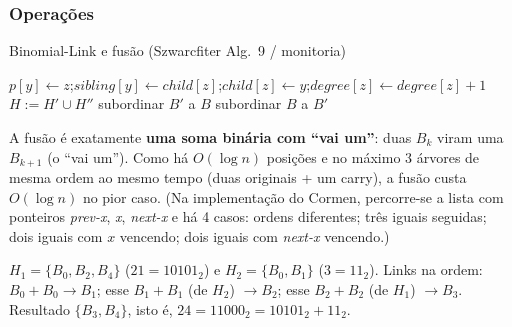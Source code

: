 \subsubsection{Operações}
\begin{pseudo}{Binomial-Link e fusão (Szwarcfiter Alg.\ 9 / monitoria)}
\begin{algorithmic}
 
  \State $p[y]\gets z$;\quad $sibling[y]\gets child[z]$;\quad $child[z]\gets y$;\quad $degree[z]\gets degree[z]+1$
\EndProcedure
{}
  \State $H := H'\cup H''$ 
   
     \State subordinar $B'$ a $B$
    \Else \State subordinar $B$ a $B'$
    \EndIf
  \EndWhile
\EndProcedure
\end{algorithmic}
\end{pseudo}
A fusão é exatamente \textbf{uma soma binária com ``vai um''}: duas $B_k$ viram uma $B_{k+1}$ (o ``vai um''). Como há $O(\log n)$ posições e no máximo 3 árvores de mesma ordem ao mesmo tempo (duas originais + um carry), a fusão custa $O(\log n)$ no pior caso. (Na implementação do Cormen, percorre-se a lista com ponteiros \emph{prev-x}, \emph{x}, \emph{next-x} e há 4 casos: ordens diferentes; três iguais seguidas; dois iguais com $x$ vencendo; dois iguais com \emph{next-x} vencendo.)

\begin{exemplo}
$H_1=\{B_0,B_2,B_4\}$ ($21=10101_2$) e $H_2=\{B_0,B_1\}$ ($3=11_2$). Links na ordem: $B_0+B_0\to B_1$; esse $B_1+B_1$ (de $H_2$) $\to B_2$; esse $B_2+B_2$ (de $H_1$) $\to B_3$. Resultado $\{B_3,B_4\}$, isto é, $24=11000_2=10101_2+11_2$.
\end{exemplo}


